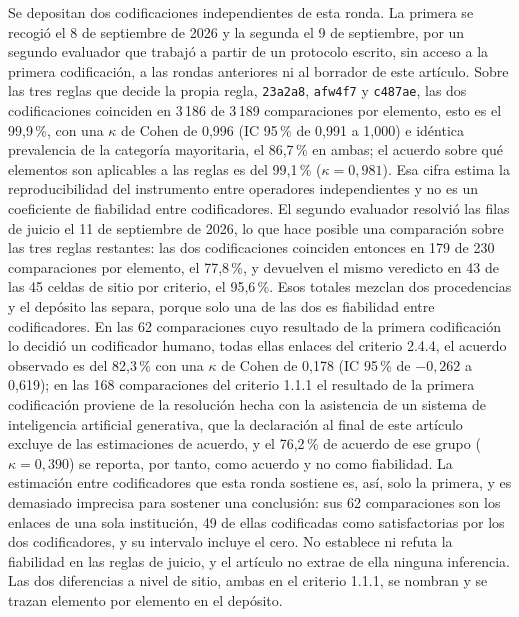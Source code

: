 \documentclass[pdflatex,sn-basic,Numbered,iicol]{sn-jnl}
\theoremstyle{thmstyleone}
\theoremstyle{thmstyletwo}
\theoremstyle{thmstylethree}
\begin{document}
Se depositan dos codificaciones independientes de esta ronda. La primera se recogi\'o el 8 de septiembre de 2026 y la segunda el 9 de septiembre, por un segundo evaluador que trabaj\'o a partir de un protocolo escrito, sin acceso a la primera codificaci\'on, a las rondas anteriores ni al borrador de este art\'iculo. Sobre las tres reglas que decide la propia regla, \texttt{23a2a8}, \texttt{afw4f7} y \texttt{c487ae}, las dos codificaciones coinciden en 3\,186 de 3\,189 comparaciones por elemento, esto es el 99,9\,\%, con una $\kappa$ de Cohen de 0,996 (IC 95\,\% de 0,991 a 1,000) e id\'entica prevalencia de la categor\'ia mayoritaria, el 86,7\,\% en ambas; el acuerdo sobre qu\'e elementos son aplicables a las reglas es del 99,1\,\% ($\kappa=0{,}981$). Esa cifra estima la reproducibilidad del instrumento entre operadores independientes y no es un coeficiente de fiabilidad entre codificadores. El segundo evaluador resolvi\'o las filas de juicio el 11 de septiembre de 2026, lo que hace posible una comparaci\'on sobre las tres reglas restantes: las dos codificaciones coinciden entonces en 179 de 230 comparaciones por elemento, el 77,8\,\%, y devuelven el mismo veredicto en 43 de las 45 celdas de sitio por criterio, el 95,6\,\%. Esos totales mezclan dos procedencias y el dep\'osito las separa, porque solo una de las dos es fiabilidad entre codificadores. En las 62 comparaciones cuyo resultado de la primera codificaci\'on lo decidi\'o un codificador humano, todas ellas enlaces del criterio 2.4.4, el acuerdo observado es del 82,3\,\% con una $\kappa$ de Cohen de 0,178 (IC 95\,\% de $-0{,}262$ a 0,619); en las 168 comparaciones del criterio 1.1.1 el resultado de la primera codificaci\'on proviene de la resoluci\'on hecha con la asistencia de un sistema de inteligencia artificial generativa, que la declaraci\'on al final de este art\'iculo excluye de las estimaciones de acuerdo, y el 76,2\,\% de acuerdo de ese grupo ($\kappa=0{,}390$) se reporta, por tanto, como acuerdo y no como fiabilidad. La estimaci\'on entre codificadores que esta ronda sostiene es, as\'i, solo la primera, y es demasiado imprecisa para sostener una conclusi\'on: sus 62 comparaciones son los enlaces de una sola instituci\'on, 49 de ellas codificadas como satisfactorias por los dos codificadores, y su intervalo incluye el cero. No establece ni refuta la fiabilidad en las reglas de juicio, y el art\'iculo no extrae de ella ninguna inferencia. Las dos diferencias a nivel de sitio, ambas en el criterio 1.1.1, se nombran y se trazan elemento por elemento en el dep\'osito.
\end{document}
